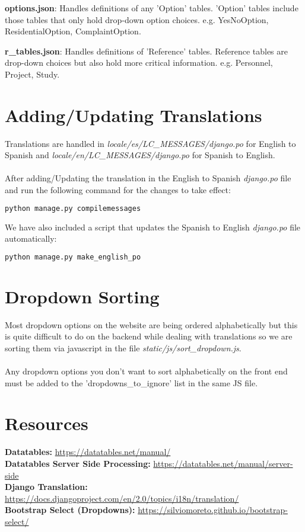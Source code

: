 \documentclass{article}
\begin{document}
\textbf{options.json}: Handles definitions of any 'Option' tables.  'Option' tables include those tables that only hold drop-down option choices. e.g. YesNoOption, ResidentialOption, ComplaintOption.

\textbf{r\_tables.json}: Handles definitions of 'Reference' tables.  Reference tables are drop-down choices but also hold more critical information.  e.g. Personnel, Project, Study.

\section{Adding/Updating Translations}
Translations are handled in \textit{locale/es/LC\_MESSAGES/django.po} for English to Spanish and \textit{locale/en/LC\_MESSAGES/django.po} for Spanish to English. 
\\\\After adding/Updating the translation in the English to Spanish \textit{django.po} file and run the following command for the changes to take effect:
\begin{lstlisting}[language=bash]
  python manage.py compilemessages
\end{lstlisting}
We have also included a script that updates the Spanish to English \textit{django.po} file automatically:
\begin{lstlisting}[language=bash]
  python manage.py make_english_po
\end{lstlisting}

\section{Dropdown Sorting}
Most dropdown options on the website are being ordered alphabetically but this is quite difficult to do on the backend while dealing with translations so we are sorting them via javascript in the file \textit{static/js/sort\_dropdown.js}.
\\\\Any dropdown options you don't want to sort alphabetically on the front end must be added to the 'dropdowns\_to\_ignore' list in the same JS file.

\section{Resources}
\textbf{Datatables:} \url{https://datatables.net/manual/}
\\\textbf{Datatables Server Side Processing:} \url{https://datatables.net/manual/server-side}
\\\textbf{Django Translation:} \url{https://docs.djangoproject.com/en/2.0/topics/i18n/translation/}
\\\textbf{Bootstrap Select (Dropdowns):} \url{https://silviomoreto.github.io/bootstrap-select/}
\end{document}
